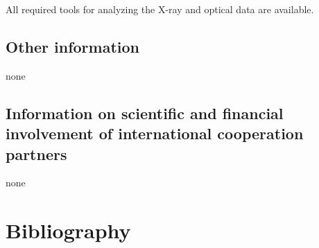 \documentclass[10pt,fleqn,twoside]{article}
\begin{document}
All required tools for analyzing the X-ray and optical data are available.

\subsection{Other information}
\vspace{-2mm}

none
\vspace{-2mm}

\subsection{Information on scientific and financial involvement of international cooperation partners}
\vspace{-2mm}

none
\vspace{-2mm}

\section{Bibliography}
\vspace{-2mm}



\end{document}
